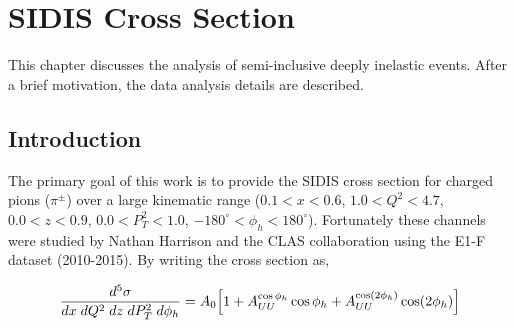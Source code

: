 %
%
%
%
%
 

\chapter{SIDIS Cross Section}
This chapter discusses the analysis of semi-inclusive deeply inelastic events.  After a brief motivation, the data analysis details are described.  

\section{Introduction}
The primary goal of this work is to provide the SIDIS cross section for charged pions ($\pi^{\pm}$) over a large kinematic range ($0.1 < x < 0.6$, $1.0 < Q^2 < 4.7$, $0.0 < z < 0.9$, $0.0 < P_{T}^{2} < 1.0$, $-180^\circ < \phi_h < 180^\circ$).  Fortunately these channels were studied by Nathan Harrison and the CLAS collaboration \cite{theses-harrison:2015} using the E1-F dataset (2010-2015).  By writing the cross section as, 

\begin{equation}
	\frac{d^5\sigma}{dx \; dQ^2 \; dz \; dP_T^2 \; d\phi_h} = A_{0} \Bigl[ 1 + A_{UU}^{\cos\phi_h} \cos\phi_h + A_{UU}^{\cos(2\phi_h)} \cos(2\phi_h) \Bigr]
\end{equation}

